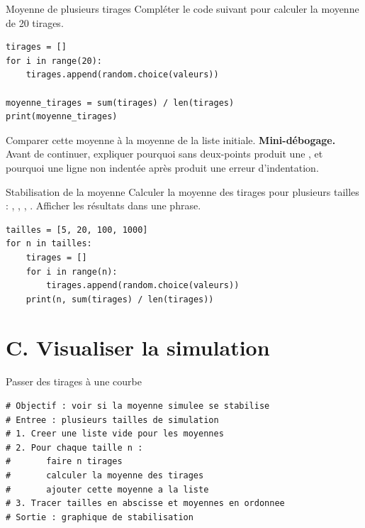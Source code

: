 \documentclass[11pt,a4paper]{article}
\begin{document}
\begin{mandatoryexercise}{Moyenne de plusieurs tirages}
Compléter le code suivant pour calculer la moyenne de 20 tirages.
\begin{lstlisting}
tirages = []
for i in range(20):
    tirages.append(random.choice(valeurs))

moyenne_tirages = sum(tirages) / len(tirages)
print(moyenne_tirages)
\end{lstlisting}
Comparer cette moyenne à la moyenne de la liste initiale.
\textbf{Mini-débogage.}
Avant de continuer, expliquer pourquoi  sans deux-points produit une , et pourquoi une ligne non indentée après  produit une erreur d'indentation.
\end{mandatoryexercise}

\begin{mandatoryexercise}{Stabilisation de la moyenne}
Calculer la moyenne des tirages pour plusieurs tailles : , , , . Afficher les résultats dans une phrase.
\begin{lstlisting}
tailles = [5, 20, 100, 1000]
for n in tailles:
    tirages = []
    for i in range(n):
        tirages.append(random.choice(valeurs))
    print(n, sum(tirages) / len(tirages))
\end{lstlisting}
\end{mandatoryexercise}

\section*{C. Visualiser la simulation}

\begin{pseudocodeexercise}{Passer des tirages à une courbe}
\begin{lstlisting}
# Objectif : voir si la moyenne simulee se stabilise
# Entree : plusieurs tailles de simulation
# 1. Creer une liste vide pour les moyennes
# 2. Pour chaque taille n :
#       faire n tirages
#       calculer la moyenne des tirages
#       ajouter cette moyenne a la liste
# 3. Tracer tailles en abscisse et moyennes en ordonnee
# Sortie : graphique de stabilisation
\end{lstlisting}
\end{pseudocodeexercise}
\end{document}
